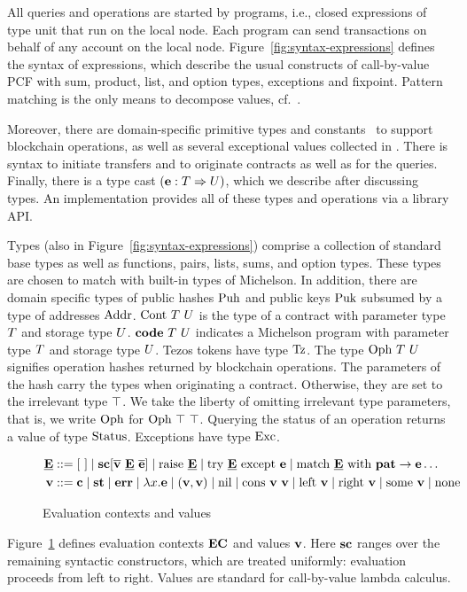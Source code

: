 \documentclass[runningheads]{llncs}
\begin{document}
All queries and operations are started by programs, i.e., closed
expressions of type unit that run on the
local node. Each program can send transactions on behalf of any
account on the local node.  Figure~\ref{fig:syntax-expressions} defines the syntax of
expressions, which describe the usual constructs of call-by-value PCF
with sum, product, list, and option types, exceptions and fixpoint.
Pattern matching is the only means to decompose values, cf.\ \PATTERN. 

Moreover, there are
domain-specific primitive types and constants \CONSTANT\ to support blockchain
operations, as well as several exceptional values collected in \ERROR.
There is syntax to initiate transfers and to originate contracts as
well as for the queries. Finally, there is a type cast
$(\textbf{e} : T \Rightarrow U)$, which we describe after discussing types. An
implementation provides all of these types and operations via a library API.

Types (also in Figure~\ref{fig:syntax-expressions}) comprise a
collection of standard base types as well as 
functions, pairs, lists, sums, and option types. These types are
chosen to match with built-in types of Michelson. 
In addition, there
are domain specific types of public hashes $\text{Puh}$ and public keys $\text{Puk}$ subsumed by
a type of addresses $\text{Addr}$. $\text{Cont}\ T\ U$ is the type of
a contract with parameter type $T$ and storage type $U$. $\textbf{code}\ T\ U$
indicates a Michelson program with parameter type $T$ and storage
type $U$. Tezos tokens have type $\text{Tz}$. The type $\text{Oph}\ T\
U$ signifies operation hashes
returned by blockchain operations. The parameters of the hash carry
the types when originating a contract. Otherwise, they are set to the
irrelevant type $\top$. We take the liberty of omitting irrelevant
type parameters, that is, we write $\text{Oph}$ for $\TOPH\ \TNO\ \TNO$.
Querying the status of an operation
returns a value of type $\text{Status}$. Exceptions have type
$\text{Exc}$. 

\begin{figure}[tp]
\begin{align*}
  \ECN{} & :: = \ECHOLE \mid \SC[\overline\VAL\ \ECN{}\ \overline\EXPR] \mid \RAISE\ \ECN{} \mid \TRY\ \ECN{}\ \EXCEPT\ \EXPR
  \mid \MATCH\ \ECN{}\ \WITH\ \PATTERN\to\EXPR \dots
  \\
  \VAL & ::= \CONSTANT \mid \STATUS \mid \ERROR \mid \lambda x.\EXPR \mid(\VAL, \VAL) \mid
         \NIL \mid \CONS\ \VAL\ \VAL \mid \LEFT\ \VAL \mid \RIGHT\
         \VAL \mid \SOME\ \VAL\mid \NONE
\end{align*}
  \caption{Evaluation contexts and values}
  \label{fig:evaluation-contexts-values}
\end{figure}
Figure~\ref{fig:evaluation-contexts-values} defines evaluation
contexts $\textbf{EC}$ and values $\textbf{v}$.
Here $\textbf{sc}$ ranges over the remaining syntactic constructors, which are
treated uniformly: evaluation proceeds from left to right. Values are
standard for call-by-value lambda calculus.
\end{document}
